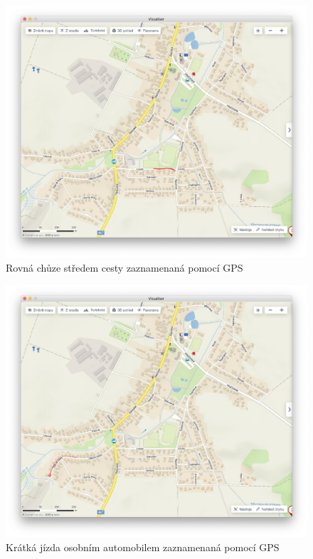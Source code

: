 \documentclass[czech, bachelor]{diploma}
\begin{document}
\begin{figure}
    \centering
    \includegraphics[width=1\textwidth]{Figures/louky.png}
    \caption{Rovná chůze středem cesty zaznamenaná pomocí GPS}
    \label{fig:louky-fullsize}
\end{figure}

\begin{figure}
    \centering
    \includegraphics[width=1\textwidth]{Figures/olsinaautem.png}
    \caption{Krátká jízda osobním automobilem zaznamenaná pomocí GPS}
    \label{fig:olsinaautem-fullsize}
\end{figure}
\end{document}
